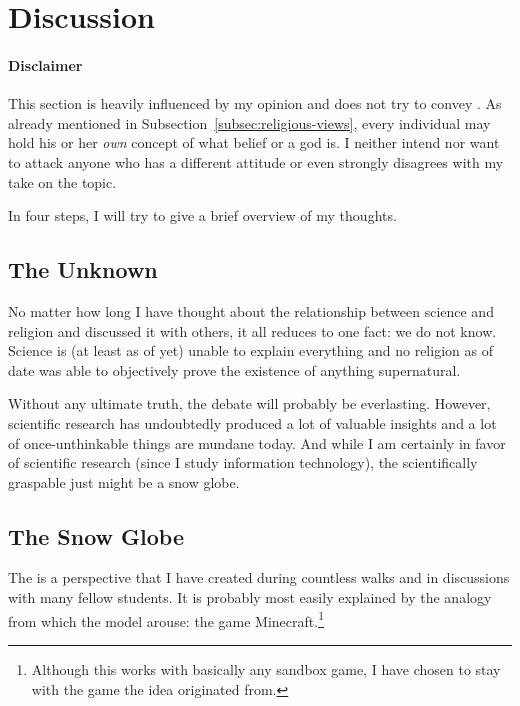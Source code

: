 \section{Discussion}
\label{sec:Discussion}
\paragraph{Disclaimer} This section is heavily influenced by my opinion and does not try to convey . As already mentioned in Subsection~\ref{subsec:religious-views}, every individual may hold his or her \emph{own} concept of what belief or a god is. I neither intend nor want to attack anyone who has a different attitude or even strongly disagrees with my take on the topic.

In four steps, I will try to give a brief overview of my thoughts.

\subsection{The Unknown}\label{subsec:the-unknown}
No matter how long I have thought about the relationship between science and religion and discussed it with others, it all reduces to one fact: we do not know. Science is (at least as of yet) unable to explain everything and no religion as of date was able to objectively prove the existence of anything supernatural.

Without any ultimate truth, the debate will probably be everlasting. However, scientific research has undoubtedly produced a lot of valuable insights and a lot of once-unthinkable things are mundane today.
And while I am certainly in favor of scientific research (since I study information technology), the scientifically graspable just might be a snow globe.

\subsection{The Snow Globe}\label{subsec:snow-globe}
The  is a perspective that I have created during countless walks and in discussions with many fellow students.
It is probably most easily explained by the analogy from which the model arouse: the game Minecraft.\footnote{Although this works with basically any sandbox game, I have chosen to stay with the game the idea originated from.}

